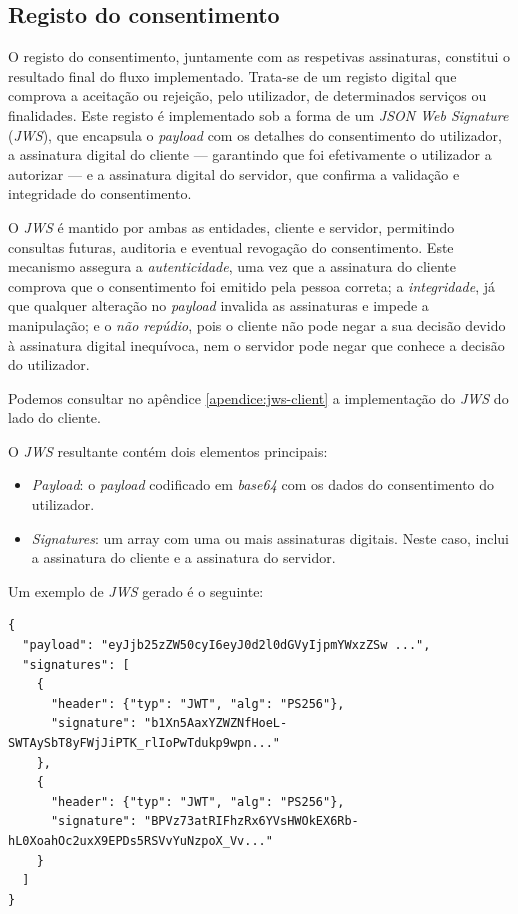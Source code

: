 \newpage

\subsection{Registo do consentimento}

O registo do consentimento, juntamente com as respetivas assinaturas, constitui o resultado final do fluxo implementado. Trata-se de um registo digital que comprova a aceitação ou rejeição, pelo utilizador, de determinados serviços ou finalidades. Este registo é implementado sob a forma de um \textit{JSON Web Signature} (\textit{JWS}), que encapsula o \textit{payload} com os detalhes do consentimento do utilizador, a assinatura digital do cliente — garantindo que foi efetivamente o utilizador a autorizar — e a assinatura digital do servidor, que confirma a validação e integridade do consentimento.

O \textit{JWS} é mantido por ambas as entidades, cliente e servidor, permitindo consultas futuras, auditoria e eventual revogação do consentimento. Este mecanismo assegura a \textit{autenticidade}, uma vez que a assinatura do cliente comprova que o consentimento foi emitido pela pessoa correta; a \textit{integridade}, já que qualquer alteração no \textit{payload} invalida as assinaturas e impede a manipulação; e o \textit{não repúdio}, pois o cliente não pode negar a sua decisão devido à assinatura digital inequívoca, nem o servidor pode negar que conhece a decisão do utilizador.

Podemos consultar no apêndice \ref{apendice:jws-client} a implementação do \textit{JWS} do lado do cliente.

O \textit{JWS} resultante contém dois elementos principais:

\begin{itemize}
    \item \textit{Payload}: o \textit{payload} codificado em \textit{base64} com os dados do consentimento do utilizador.
    \item \textit{Signatures}: um array com uma ou mais assinaturas digitais. Neste caso, inclui a assinatura do cliente e a assinatura do servidor.
\end{itemize}

Um exemplo de \textit{JWS} gerado é o seguinte:

\begin{lstlisting}
{
  "payload": "eyJjb25zZW50cyI6eyJ0d2l0dGVyIjpmYWxzZSw ...",
  "signatures": [
    {
      "header": {"typ": "JWT", "alg": "PS256"},
      "signature": "b1Xn5AaxYZWZNfHoeL-SWTAySbT8yFWjJiPTK_rlIoPwTdukp9wpn..."
    },
    {
      "header": {"typ": "JWT", "alg": "PS256"},
      "signature": "BPVz73atRIFhzRx6YVsHWOkEX6Rb-hL0XoahOc2uxX9EPDs5RSVvYuNzpoX_Vv..."
    }
  ]
}
\end{lstlisting}

